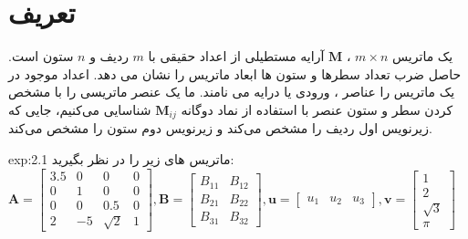 \section{\textbf{تعریف}}
\label{sec:2.1}
{
    \Large
    \begin{spacing}{1.5}
        یک ماتریس $m\times n$ ، $\textbf{M}$ آرایه مستطیلی از اعداد حقیقی با $m$ ردیف و $n$ ستون است.
        حاصل ضرب تعداد سطرها و ستون ها ابعاد ماتریس را نشان می دهد.
        اعداد موجود در یک ماتریس را عناصر ، ورودی یا درایه می نامند.
        ما یک عنصر ماتریسی را با مشخص کردن سطر و ستون عنصر با استفاده از نماد دوگانه $\textbf{M}_{ij}$ شناسایی می‌کنیم،
        جایی که زیرنویس اول ردیف را مشخص می‌کند و زیرنویس دوم ستون را مشخص می‌کند.

        \begin{example}{exp:2.1}
            \Large
            ماتریس های زیر را در نظر بگیرید:\\
            $\textbf{A}=\begin{bmatrix}
                            3.5 & 0  & 0                      & 0 \\
                            0   & 1  & 0                      & 0 \\
                            0   & 0  & 0.5                    & 0 \\
                            2   & -5 & \sqrt{\displaystyle 2} & 1
            \end{bmatrix}, \textbf{B}=\begin{bmatrix}
                                          B_{11} & B_{12} \\
                                          B_{21} & B_{22} \\
                                          B_{31} & B_{32}
            \end{bmatrix}, \textbf{u}=\begin{bmatrix}
                                          u_{1} & u_{2} & u_{3}
            \end{bmatrix}, \textbf{v}=\begin{bmatrix}
                                          1                      \\
                                          2                      \\
                                          \sqrt{\displaystyle 3} \\
                                          \pi
            \end{bmatrix}$
            \\

\end{example}
\end{spacing}}
